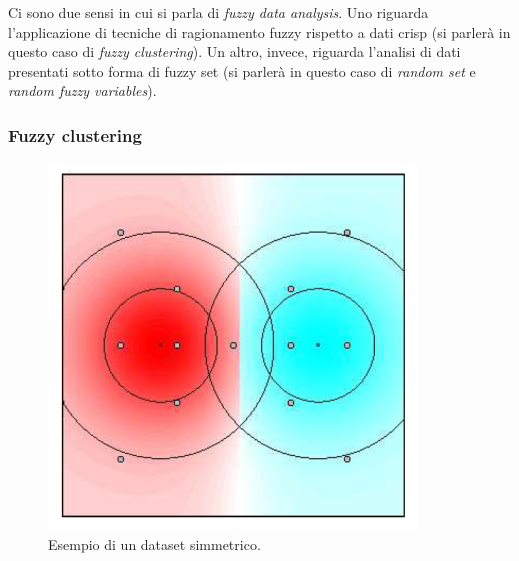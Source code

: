 \documentclass[10pt,a4paper]{article}
\begin{document}
Ci sono due sensi in cui si parla di \emph{fuzzy data analysis}. Uno riguarda l'applicazione di tecniche di ragionamento fuzzy rispetto a dati crisp (si parlerà in questo caso di \emph{fuzzy clustering}). Un altro, invece, riguarda l'analisi di dati presentati sotto forma di fuzzy set (si parlerà in questo caso di \emph{random set} e \emph{random fuzzy variables}).

\subsubsection{Fuzzy clustering}


\begin{figure}
\centering
\includegraphics[scale=0.3]{img/symmetricdata.png}
\caption{Esempio di un dataset simmetrico.}
\label{fig:33}
\end{figure}
\end{document}
